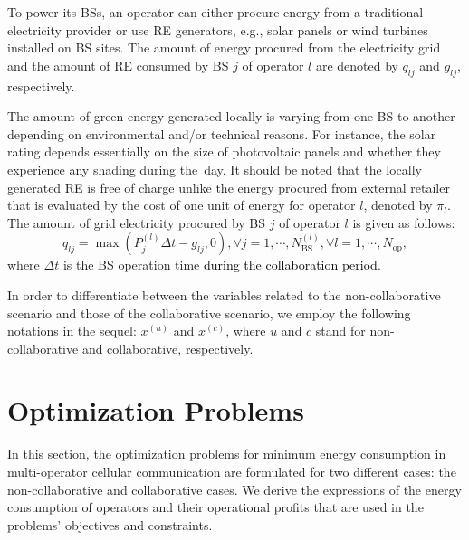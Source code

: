 \documentclass[10pt, letter, twocolumn]{IEEEtran}
\begin{document}
To power its BSs, an operator can either procure energy from a traditional electricity provider or use RE generators, e.g., solar panels or wind turbines installed on BS sites. The amount of energy procured from the electricity grid and the amount of RE consumed by BS $j$ of operator $l$ are denoted by $q_{lj}$ and $g_{lj}$, respectively.

The amount of green energy generated locally is varying from one BS to another depending on environmental and/or technical reasons. For instance, the solar rating depends essentially on the size of photovoltaic panels and whether they experience any shading during the~day.
It should be noted that the locally generated RE is free of charge unlike the energy procured from external retailer that is evaluated by the cost of one unit of energy for operator $l$, denoted by $\pi_{l}$. The amount of grid electricity procured by BS $j$ of operator $l$ is given as follows:
\begin{equation}
\label{fossilenergy}
q_{lj}=\max(P_j^{(l)}\Delta t-g_{lj}, 0), \forall j=1,\cdots, N_{\text{BS}}^{(l)}, \forall l=1,\cdots, N_{\text{op}},
\end{equation}
where $\Delta t$ is the BS operation time \textcolor{black}{during the collaboration period}.

In order to differentiate between the variables related to the non-collaborative scenario and those of the collaborative scenario, we employ the following notations in the sequel: $x^{(u)}$ and $x^{(c)}$, where $u$ and $c$ stand for non-collaborative and collaborative, respectively.

\section{Optimization Problems} \label{sec4}
In this section, the optimization problems for minimum energy consumption in multi-operator cellular communication are formulated for two different cases: the non-collaborative and collaborative cases. We derive the expressions of the energy consumption of operators and their operational profits that are used in the problems' objectives and constraints.
\end{document}
